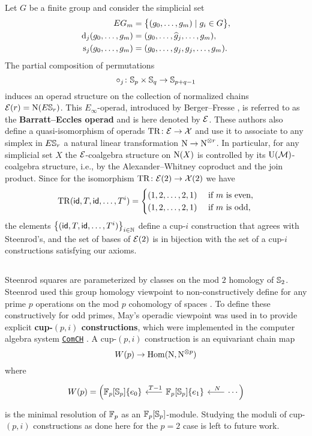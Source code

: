 Let $G$ be a finite group and consider the simplicial set
\[
\begin{split}
EG_m &= \big\{ (g_0, \dots, g_m) \mid g_i \in G \big\}, \\
\operatorname{d}_j(g_0, \dots, g_m) &= (g_0, \dots, \widehat g_j, \dots, g_m), \\
\operatorname{s}_j(g_0, \dots, g_m) &= (g_0, \dots, g_j, g_j, \dots, g_m).
\end{split}
\]
The partial composition of permutations
\[
\circ_j \colon \mathbb{S}_p \times \mathbb{S}_q \to \mathbb{S}_{p+q-1}
\]
induces an operad structure on the collection of normalized chains $\mathcal{E}(r) = \operatorname{N}(E \mathbb{S}_r)$.
This $E_\infty$-operad, introduced by Berger--Fresse \cite{berger2004combinatorial}, is referred to as the \textbf{Barratt--Eccles operad} and is here denoted by $\mathcal{E}$.
These authors also define a quasi-isomorphism of operads $\mathrm{TR} \colon \mathcal{E} \to \mathcal{X}$ and use it to associate to any simplex in $E \mathbb{S}_r$ a natural linear transformation $\operatorname{N} \to \operatorname{N}^{\otimes r}$.
In particular, for any simplicial set $X$ the $\mathcal{E}$-coalgebra structure on $\operatorname{N}(X)$ is controlled by its $\operatorname{U}(\operatorname{\mathcal{M}})$-coalgebra structure, i.e., by the Alexander--Whitney coproduct and the join product.
Since for the isomorphism $\mathrm{TR} \colon \mathcal{E}(2) \to \mathcal{X}(2)$ we have
\[
\mathrm{TR}(\mathsf{id}, T, \mathsf{id}, \dots, T^i) =
\begin{cases}
(1,2,\dots,2,1) & \text{ if } m \text{ is even}, \\
(1,2,\dots,2,1) & \text{ if } m \text{ is odd},
\end{cases}
\]
the elements $\big\{ (\mathsf{id}, T, \mathsf{id}, \dots, T^i) \big\}_{i \in \mathbb{N}}$ define a \mbox{cup-$i$} construction that agrees with Steenrod's, and the set of bases of $\mathcal{E}(2)$ is in bijection with the set of a \mbox{cup-$i$} constructions satisfying our axioms.

\subsection{}

Steenrod squares are parameterized by classes on the mod $2$ homology of $\mathbb{S}_2$.
Steenrod used this group homology viewpoint to non-constructively define for any prime $p$ operations on the mod $p$ cohomology of spaces \cite{steenrod1952reduced, steenrod1953cyclic}.
To define these constructively for odd primes, May's operadic viewpoint \cite{may1970general} was used in \cite{medina2021may_st} to provide explicit \textbf{cup-$(p,i)$ constructions}, which were implemented in the computer algebra system \href{https://github.com/ammedmar/comch}{\texttt{ComCH}} \cite{medina2021comch}.
A cup-$(p,i)$ construction is an equivariant chain map
\[
W(p) \to \mathrm{Hom}(\operatorname{N}, \operatorname{N}^{\otimes p})
\]
where
\[
\begin{tikzcd}[column sep=20pt]
	W(p) = \Big(
	\Fp[\Sym_p]\{e_0\} &
	\Fp[\Sym_p]\{e_1\} \arrow[l, "\ T-1"'] &
	\arrow[l, "\ N"'] \cdots \Big)
\end{tikzcd}
\]
is the minimal resolution of ${\mathbb{F}_p}$ as an ${\mathbb{F}_p}[\mathbb{S}_p]$-module.
Studying the moduli of cup-$(p,i)$ constructions as done here for the $p = 2$ case is left to future work.
